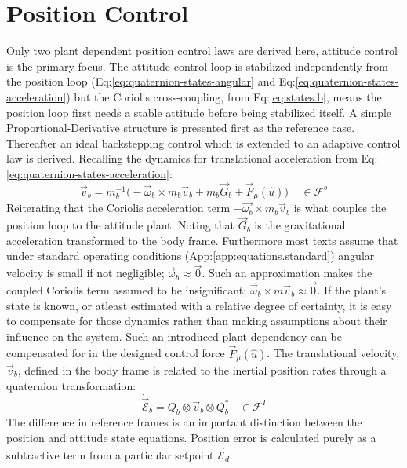 \section{Position Control}
\label{sec:control.position}
Only two plant dependent position control laws are derived here, attitude control is the primary focus. The attitude control loop is stabilized independently from the position loop (Eq:\ref{eq:quaternion-states-angular} and Eq:\ref{eq:quaternion-states-acceleration}) but the Coriolis cross-coupling, from Eq:\ref{eq:states.b}, means the position loop first needs a stable attitude before being stabilized itself. A simple Proportional-Derivative structure is presented first as the reference case. Thereafter an ideal backstepping control which is extended to an adaptive control law is derived. Recalling the dynamics for translational acceleration from Eq:\ref{eq:quaternion-states-acceleration}:
\begin{equation}\label{eq:position-deriv}
\dot{\vec{v}}_b=m_b^{-1}\big(-\vec{\omega}_b\times m_b\vec{v}_b+m_b\vec{G}_b+\vec{F}_\mu(\hat{u})\big)~~~~~\in\mathcal{F}^b
\end{equation}
Reiterating that the Coriolis acceleration term $-\vec{\omega_b}\times m_b\vec{v}_b$ is what couples the position loop to the attitude plant. Noting that $\vec{G}_b$ is the gravitational acceleration transformed to the body frame. Furthermore most texts assume that under standard operating conditions (App:\ref{app:equations.standard}) angular velocity is small if not negligible; $\vec{\omega}_b\approx\vec{0}$. Such an approximation makes the coupled Coriolis term assumed to be insignificant; $\vec{\omega}_b\times m\vec{v}_b\approx \vec{0}$. If the plant's state is known, or atleast estimated with a relative degree of certainty, it is easy to compensate for those dynamics rather than making assumptions about their influence on the system. Such an introduced plant dependency can be compensated for in the designed control force $\vec{F}_\mu(\hat{u})$. The translational velocity, $\vec{v}_b$, defined in the body frame is related to the inertial position rates through a quaternion transformation:
\begin{equation}
\dot{\vec{\mathcal{E}}}_b=Q_b\otimes\vec{v}_b\otimes Q_b^*~~~~\in\mathcal{F}^I
\end{equation}
The difference in reference frames is an important distinction between the position and attitude state equations. Position error is calculated purely as a subtractive term from a particular setpoint $\vec{\mathcal{E}}_d$:
